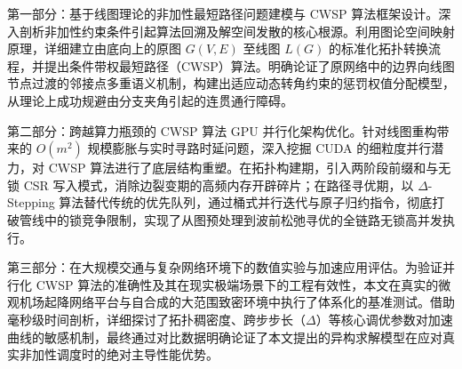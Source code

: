 第一部分：基于线图理论的非加性最短路径问题建模与 CWSP 算法框架设计。深入剖析非加性约束条件引起算法回溯及解空间发散的核心根源。利用图论空间映射原理，详细建立由底向上的原图 $G(V,E)$ 至线图 $L(G)$ 的标准化拓扑转换流程，并提出条件带权最短路径（CWSP）算法。明确论证了原网络中的边界向线图节点过渡的邻接点多重语义机制，构建出适应动态转角约束的惩罚权值分配模型，从理论上成功规避由分支夹角引起的连贯通行障碍。

第二部分：跨越算力瓶颈的 CWSP 算法 GPU 并行化架构优化。针对线图重构带来的 $O(m^2)$ 规模膨胀与实时寻路时延问题，深入挖掘 CUDA 的细粒度并行潜力，对 CWSP 算法进行了底层结构重塑。在拓扑构建期，引入两阶段前缀和与无锁 CSR 写入模式，消除边裂变期的高频内存开辟碎片；在路径寻优期，以 $\Delta$-Stepping 算法替代传统的优先队列，通过桶式并行迭代与原子归约指令，彻底打破管线中的锁竞争限制，实现了从图预处理到波前松弛寻优的全链路无锁高并发执行。

第三部分：在大规模交通与复杂网络环境下的数值实验与加速应用评估。为验证并行化 CWSP 算法的准确性及其在现实极端场景下的工程有效性，本文在真实的微观机场起降网络平台与自合成的大范围致密环境中执行了体系化的基准测试。借助毫秒级时间剖析，详细探讨了拓扑稠密度、跨步步长（$\Delta$）等核心调优参数对加速曲线的敏感机制，最终通过对比数据明确论证了本文提出的异构求解模型在应对真实非加性调度时的绝对主导性能优势。
